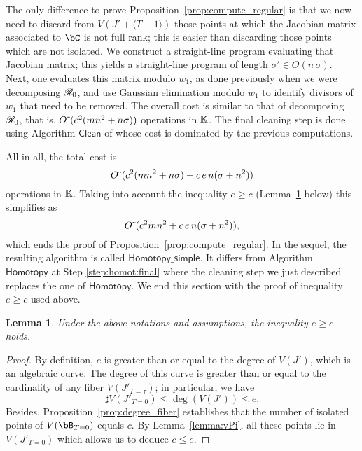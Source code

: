 \documentclass[12pt]{article}
\newtheorem{lemma}[definition]{Lemma}
\begin{document}
The only difference to prove Proposition~\ref{prop:compute_regular} is
that we now need to discard from $V(J' + \langle T-1\rangle)$ those
points at which the Jacobian matrix associated to $\bC$ is not full
rank; this is easier than discarding those points which are not
isolated. We construct a straight-line program evaluating that
Jacobian matrix; this yields a straight-line program of length
$\sigma'\in O(n \, \sigma)$. Next, one evaluates this matrix modulo
$w_1$, as done previously when we were decomposing $\mathscr{R}_0$, and use
Gaussian elimination modulo $w_1$ to identify divisors of $w_1$ that
need to be removed. The overall cost is similar to that of decomposing
$\mathscr{R}_0$, that is, ${O}{\,\tilde{ }\,}(c^2(mn^2+n\sigma))$ operations in $\mathbb{K}$.
The final cleaning step is done using Algorithm $\mathsf{Clean}$ of
\cite{GiLeSa01} whose cost is dominated by the previous computations.

All in all, the total cost is
$$
{O}{\,\tilde{ }\,}(c^2(mn^2+n\sigma) + c\, e\,n (\sigma+n^2)  )
$$
operations in $\mathbb{K}$. Taking into account the inequality
$e\geq c$ (Lemma~\ref{lemma:e-geq-c} below) this simplifies as 
$$
{O}{\,\tilde{ }\,}(c^2 mn^2  + c\, e\,n (\sigma+n^2) ),
$$
which ends the proof of Proposition~\ref{prop:compute_regular}. In the
sequel, the resulting algorithm is called
$\mathsf{Homotopy\_simple}$. It differs from Algorithm
$\mathsf{Homotopy}$ at Step \ref{step:homot:final} where the cleaning step we
just described replaces the one of $\mathsf{Homotopy}$.
We end this section with the proof of inequality $e\geq c$ used above.
\begin{lemma}\label{lemma:e-geq-c}
Under the above notations and assumptions, the inequality $e\geq c$ holds.   
\end{lemma}
\begin{proof}
  By definition, $e$ is greater than or equal to the degree of
  $V(J')$, which is an algebraic curve.  The degree of this curve is
  greater than or equal to the cardinality of any fiber
  $V(J'_{T=\tau})$; in particular, we have
  \[
  \sharp V(J'_{T=0}) \leq \deg(V(J')) \leq e.
  \]
  Besides, Proposition~\ref{prop:degree_fiber} establishes that the
  number of isolated points of $V(\bB_{T=0})$ equals $c$. By Lemma~\ref{lemma:vPi}, all
  these points lie in $V(J'_{T=0})$ which allows us to deduce $c\leq e$.
\end{proof}

\end{document}
